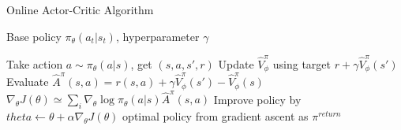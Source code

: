 \begin{algorithm}[t!]
\caption{Online Actor-Critic Algorithm}
\begin{algorithmic}[1]
\label{alg:onlineac}
\REQUIRE Base policy $\pi_\theta(a_t|s_t)$, hyperparameter $\gamma$

    \STATE Take action $a\sim\pi_\theta(a|s)$, get $(s,a,s',r)$
    \STATE Update $\hat{V}^\pi_\phi$ using target $r+\gamma\hat{V}^\pi_\phi(s')$
    \STATE Evaluate $\hat{A}^\pi(s,a)=r(s,a)+\gamma\hat{V}^\pi_\phi(s')-\hat{V}^\pi_\phi(s)$
    \STATE $\nabla_\theta J(\theta) \simeq \sum_i\nabla_\theta\log \pi_\theta(a|s)\hat{A}^\pi(s,a)$
    \STATE Improve policy by $theta \leftarrow \theta + \alpha\nabla_\theta J(\theta)$
\ENDWHILE
\RETURN optimal policy from gradient ascent as $\pi^{return}$
\end{algorithmic}
\end{algorithm}